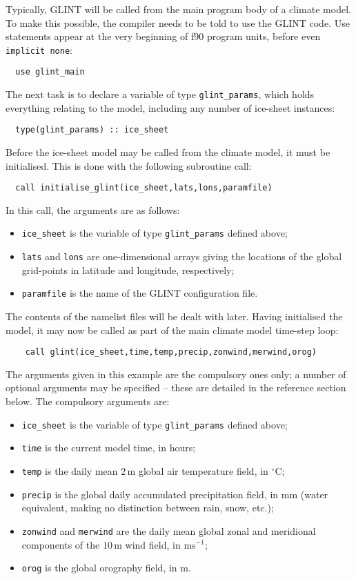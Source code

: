 Typically, GLINT will be called from the main program body of a
climate model. To make this possible, the compiler needs to be told to use the
GLINT code. Use statements appear at the very beginning of f90 program
units, before even \texttt{implicit none}:
%
\begin{verbatim}
  use glint_main
\end{verbatim}
%
The next task is to declare a variable of type \texttt{glint\_params}, which
holds everything relating to the model, including any number of ice-sheet
instances:
%
\begin{verbatim}
  type(glint_params) :: ice_sheet
\end{verbatim}
%
Before the ice-sheet model may be called from the climate model, it must be
initialised. This is done with the following subroutine call:
%
\begin{verbatim}
  call initialise_glint(ice_sheet,lats,lons,paramfile)
\end{verbatim}
%
In this call, the arguments are as follows:
%
\begin{itemize}
\item \texttt{ice\_sheet} is the variable of type \texttt{glint\_params}
 defined above;
\item \texttt{lats} and \texttt{lons} are one-dimensional arrays giving the
  locations of the global grid-points in latitude and longitude, respectively; 
\item \texttt{paramfile} is the name of the GLINT configuration file.
\end{itemize}
%
The contents of the namelist files will be dealt with later. Having
initialised the model, it may now be called as part of the main climate
model time-step loop:
%
\begin{verbatim}
    call glint(ice_sheet,time,temp,precip,zonwind,merwind,orog)
\end{verbatim} 
%
The arguments given in this example are the compulsory ones only; a number of
optional arguments may be specified -- these are detailed in the reference
section below. The compulsory arguments are:
%
\begin{itemize}
\item \texttt{ice\_sheet} is the variable of type \texttt{glint\_params}
 defined above;
\item \texttt{time} is the current model time, in hours;
\item \texttt{temp} is the daily mean $2\,\mathrm{m}$ global air temperature field, in
  $^{\circ}\mathrm{C}$;
\item \texttt{precip} is the global daily accumulated precipitation field,
  in $\mathrm{mm}$ (water equivalent, making no distinction
  between rain, snow, etc.);
\item \texttt{zonwind} and \texttt{merwind} are the daily mean global zonal and
  meridional components of the $10\,\mathrm{m}$ wind field, in
  $\mathrm{ms}^{-1}$;
\item \texttt{orog} is the global orography field, in $\mathrm{m}$.
\end{itemize}
